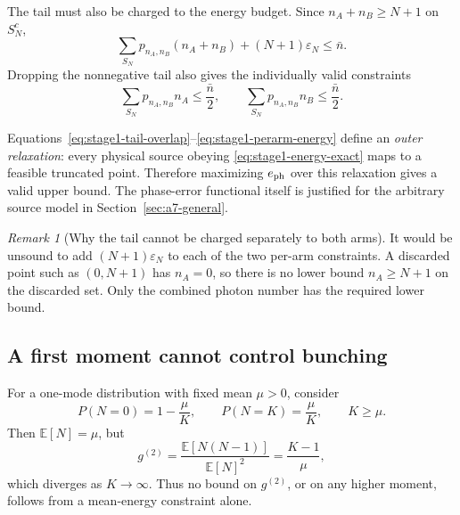 \documentclass[11pt]{article}
\theoremstyle{remark}
\newtheorem{remark}{Remark}
\begin{document}
The tail must also be charged to the energy budget. Since
\(n_A+n_B\ge N+1\) on \(S_N^c\),
\begin{equation}
    \sum_{S_N}p_{n_A,n_B}(n_A+n_B)
    +(N+1)\varepsilon_N
    \le
    \bar n.
    \label{eq:stage1-combined-energy}
\end{equation}
Dropping the nonnegative tail also gives the individually valid constraints
\begin{equation}
    \sum_{S_N}p_{n_A,n_B}n_A
    \le\frac{\bar n}{2},
    \qquad
    \sum_{S_N}p_{n_A,n_B}n_B
    \le\frac{\bar n}{2}.
    \label{eq:stage1-perarm-energy}
\end{equation}

Equations~\eqref{eq:stage1-tail-overlap}--\eqref{eq:stage1-perarm-energy}
define an \emph{outer relaxation}: every physical source obeying
\eqref{eq:stage1-energy-exact} maps to a feasible truncated point. Therefore
maximizing \(e_{\rm ph}\) over this relaxation gives a valid upper bound.  The
phase-error functional itself is justified for the arbitrary source model in
Section~\ref{sec:a7-general}.

\begin{remark}[Why the tail cannot be charged separately to both arms]
It would be unsound to add \((N+1)\varepsilon_N\) to each of the two
per-arm constraints. A discarded point such as \((0,N+1)\) has
\(n_A=0\), so there is no lower bound \(n_A\ge N+1\) on the discarded set.
Only the combined photon number has the required lower bound.
\end{remark}

\subsection{A first moment cannot control bunching}

For a one-mode distribution with fixed mean \(\mu>0\), consider
\begin{equation}
    P(N=0)=1-\frac{\mu}{K},
    \qquad
    P(N=K)=\frac{\mu}{K},
    \qquad K\ge\mu.
    \label{eq:stage1-two-point}
\end{equation}
Then \(\mathbb E[N]=\mu\), but
\begin{equation}
    g^{(2)}
    =
    \frac{\mathbb E[N(N-1)]}{\mathbb E[N]^2}
    =
    \frac{K-1}{\mu},
    \label{eq:stage1-unbounded-g2}
\end{equation}
which diverges as \(K\to\infty\). Thus no bound on \(g^{(2)}\), or on any
higher moment, follows from a mean-energy constraint alone.
\end{document}
